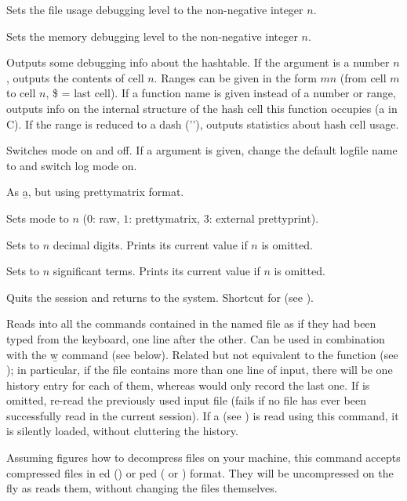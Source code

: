  Sets the file usage debugging level 
to the non-negative integer $n$.

 Sets the memory debugging level 
to the non-negative integer $n$.

 Outputs some debugging info about the
hashtable. If the argument is a number $n$, outputs the contents of cell
$n$. Ranges can be given in the form $m$\kbd{-}$n$ (from cell $m$ to cell
$n$, \$ = last cell). If a function name is given instead of a number or
range, outputs info on the internal structure of the hash cell this
function occupies (a  in C). If the range is reduced to
a dash ('\kbd{-}'), outputs statistics about hash cell usage.

 Switches  mode on and off.
If a  argument is given, change the default logfile name to
 and switch log mode on.

 As \b{a}, but using prettymatrix format.

 Sets  mode to $n$ ($0$: raw, $1$:
prettymatrix, $3$: external prettyprint).

 Sets  to $n$ decimal
digits. Prints its current value if $n$ is omitted.

 Sets  to $n$ significant terms.
Prints its current value if $n$ is omitted.

 Quits the  session and returns to the system.
Shortcut for \kbd{()} (see ).

 Reads into  all the
commands contained in the named file as if they had been typed from the
keyboard, one line after the other. Can be used in combination with the \b{w}
command (see below). Related but not equivalent to the function 
(see ); in particular, if the file contains more than one
line of input, there will be one history entry for each of them, whereas
 would only record the last one. If  is omitted,
re-read the previously used input file (fails if no file has ever been
successfully read in the current session). If a  
(see ) is read using this command, it is silently loaded,
without cluttering the history.

Assuming  figures how to decompress files on your machine, this
command accepts compressed files in ed () or
ped ( or ) format. They will be uncompressed on
the fly as  reads them, without changing the files themselves.

